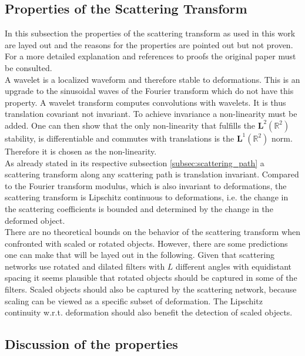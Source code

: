 \subsection{Properties of the Scattering Transform}
\label{subsec:properties}


In this subsection the properties of the scattering transform as used in this work are layed out and the reasons for the properties are pointed out but not proven. For a more detailed explanation and references to proofs the original paper \cite{scatteringTransform2012} must be consulted. \\
A wavelet is a localized waveform and therefore stable to deformations. This is an upgrade to the sinusoidal waves of the Fourier transform which do not have this property. 
A wavelet transform computes convolutions with wavelets. It is thus translation covariant not invariant. To achieve invariance a non-linearity must be added. One can then show that the only non-linearity that fulfills the $\textbf{L}^2(\mathbb{R}^2)$ stability, is differentiable and commutes with translations is the $\textbf{L}^1(\mathbb{R}^2)$ norm. Therefore it is chosen as the non-linearity.\\
As already stated in its respective subsection \ref{subsec:scattering_path} a scattering transform along any scattering path is translation invariant. 
Compared to the Fourier transform modulus, which is also invariant to deformations, the scattering transform is Lipschitz continuous to deformations, i.e. the change in the scattering coefficients is bounded and determined by the change in the deformed object. \\
There are no theoretical bounds on the behavior of the scattering transform when confronted with scaled or rotated objects. However, there are some predictions one can make that will be layed out in the following. Given that scattering networks use rotated and dilated filters with $L$ different angles with equidistant spacing it seems plausible that rotated objects should be captured in some of the filters. Scaled objects should also be captured by the scattering network, because scaling can be viewed as a specific subset of deformation. The Lipschitz continuity w.r.t. deformation should also benefit the detection of scaled objects. 

\subsection{Discussion of the properties}

